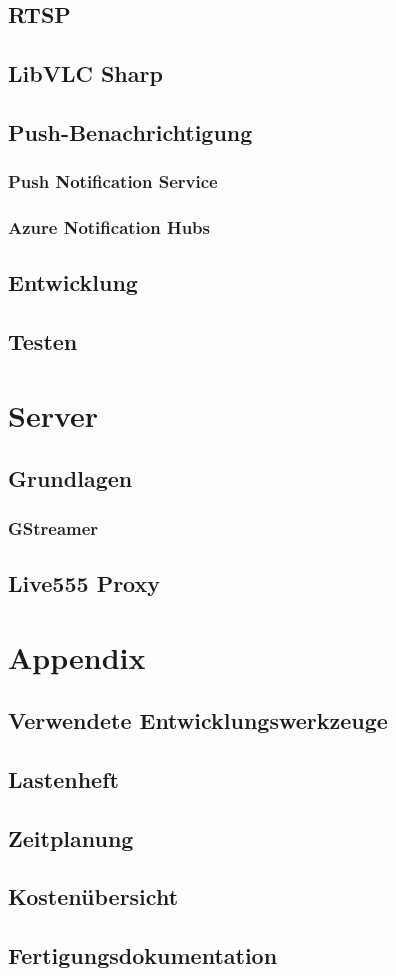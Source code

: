 \documentclass[a4paper, 12pt, twoside, openright
]{memoir}
\begin{document}
\chapter{RTSP}
\chapter{LibVLC Sharp}
\chapter{Push-Benachrichtigung}
\section{Push Notification Service}
\section{Azure Notification Hubs}
\chapter{Entwicklung}

\chapter{Testen}

\part{Server}
\chapter{Grundlagen}
\section{GStreamer}
\chapter{Live555 Proxy}

\appendix
\part{Appendix}
\chapter{Verwendete Entwicklungswerkzeuge}
\chapter{Lastenheft}
\chapter{Zeitplanung}
\chapter{Kostenübersicht}
\chapter{Fertigungsdokumentation}
\end{document}
